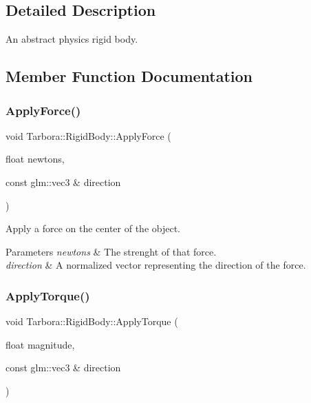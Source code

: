 \subsection{Detailed Description}
An abstract physics rigid body. 

\subsection{Member Function Documentation}
\mbox{\label{classTarbora_1_1RigidBody_ae60a0e3d1f035698dfc11a117c28999b}} 
\subsubsection{\texorpdfstring{Apply\+Force()}{ApplyForce()}}
{\footnotesize\ttfamily void Tarbora\+::\+Rigid\+Body\+::\+Apply\+Force (\begin{DoxyParamCaption}\item[{float}]{newtons,  }\item[{const glm\+::vec3 \&}]{direction }\end{DoxyParamCaption})}



Apply a force on the center of the object. 


\begin{DoxyParams}{Parameters}
{\em newtons} & The strenght of that force. \\
\hline
{\em direction} & A normalized vector representing the direction of the force. \\
\hline
\end{DoxyParams}
\mbox{\label{classTarbora_1_1RigidBody_a025666d2545230e12b546b68d955871c}} 
\subsubsection{\texorpdfstring{Apply\+Torque()}{ApplyTorque()}}
{\footnotesize\ttfamily void Tarbora\+::\+Rigid\+Body\+::\+Apply\+Torque (\begin{DoxyParamCaption}\item[{float}]{magnitude,  }\item[{const glm\+::vec3 \&}]{direction }\end{DoxyParamCaption})}



